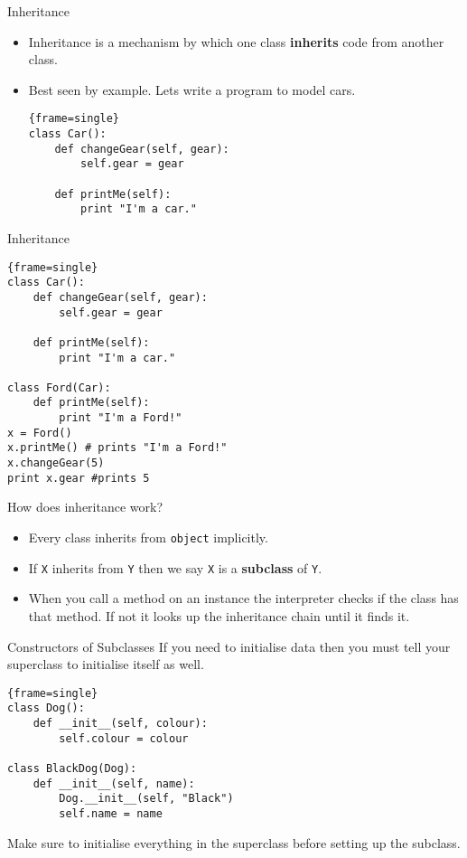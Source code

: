 \documentclass{beamer}
\newcommand{\snippet}{\lstinline}
\begin{document}
\begin{frame}[fragile]{Inheritance}
	\begin{itemize}
	\item { Inheritance is a mechanism by which one class \textbf{inherits} code from another class.
	}
	\pause
	\item {Best seen by example. Lets write a program to model cars.
  \begin{block}{}
\begin{lstlisting}{frame=single}
class Car():
    def changeGear(self, gear):
        self.gear = gear 
	
    def printMe(self):
        print "I'm a car."	    
\end{lstlisting}
\end{block}
	}
	\end{itemize}
\end{frame}
\begin{frame}[fragile]{Inheritance}
  \begin{block}{}
\begin{lstlisting}{frame=single}
class Car():
    def changeGear(self, gear):
        self.gear = gear 
	
    def printMe(self):
        print "I'm a car."	    

class Ford(Car):
    def printMe(self):
        print "I'm a Ford!"
x = Ford()
x.printMe() # prints "I'm a Ford!"
x.changeGear(5)
print x.gear #prints 5
\end{lstlisting}
\end{block}

\end{frame}
\begin{frame}[fragile]{How does inheritance work?}
	\begin{itemize}
	\item {Every class inherits from \snippet{object} implicitly.  }
	\pause
	\item {If \snippet{X} inherits from \snippet{Y} then we say \snippet{X} is a \textbf{subclass} of \snippet{Y}.}
	\pause 
	\item {When you call a method on an instance the interpreter checks if the class has that method. If not it looks up the inheritance chain until it finds it.}
	\end{itemize}
\end{frame}
\begin{frame}[fragile]{Constructors of Subclasses}
If you need to initialise data then you must tell your superclass to initialise itself as well.
  \begin{block}{}
\begin{lstlisting}{frame=single}
class Dog():
    def __init__(self, colour):
        self.colour = colour 

class BlackDog(Dog):
    def __init__(self, name):
        Dog.__init__(self, "Black")
        self.name = name
\end{lstlisting}
\end{block}
Make sure to initialise everything in the superclass before setting up the subclass.	
\end{frame}
\end{document}
